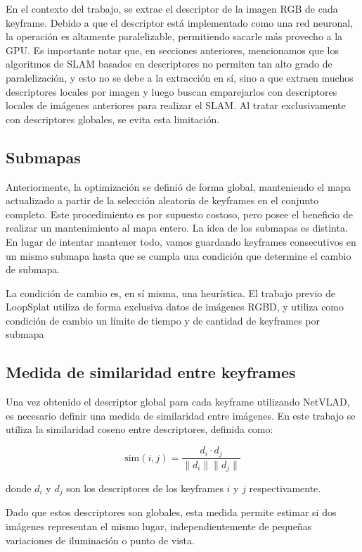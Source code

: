En el contexto del trabajo, se extrae el descriptor de la imagen RGB de cada keyframe. Debido a que el descriptor está implementado como una red neuronal, la operación es altamente paralelizable, permitiendo sacarle más provecho a la GPU. Es importante notar que, en secciones anteriores, mencionamos que los algoritmos de SLAM basados en descriptores no permiten tan alto grado de paralelización, y esto no se debe a la extracción en sí, sino a que extraen muchos descriptores locales por imagen y luego buscan emparejarlos con descriptores locales de imágenes anteriores para realizar el SLAM. Al tratar exclusivamente con descriptores globales, se evita esta limitación.

\subsection{Submapas}

Anteriormente, la optimización se definió de forma global, manteniendo el mapa actualizado a partir de la selección aleatoria de keyframes en el conjunto completo. Este procedimiento es por supuesto costoso, pero posee el beneficio de realizar un mantenimiento al mapa entero. La idea de los submapas es distinta. En lugar de intentar mantener todo, vamos guardando keyframes consecutivos en un mismo submapa hasta que se cumpla una condición que determine el cambio de submapa. 

La condición de cambio es, en sí misma, una heurística. El trabajo previo de LoopSplat utiliza de forma exclusiva datos de imágenes RGBD, y utiliza como condición de cambio un límite de tiempo y de cantidad de keyframes por submapa


\subsection{Medida de similaridad entre keyframes}

Una vez obtenido el descriptor global para cada keyframe utilizando NetVLAD, es necesario definir una medida de similaridad entre imágenes. En este trabajo se utiliza la similaridad coseno entre descriptores, definida como:

\begin{equation}
\text{sim}(i,j) = \frac{d_i \cdot d_j}{\|d_i\|\|d_j\|}
\end{equation}

\noindent donde $d_i$ y $d_j$ son los descriptores de los keyframes $i$ y $j$ respectivamente.

Dado que estos descriptores son globales, esta medida permite estimar si dos imágenes representan el mismo lugar, independientemente de pequeñas variaciones de iluminación o punto de vista.

